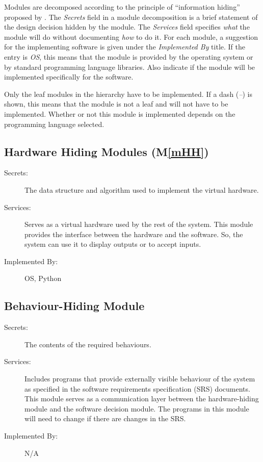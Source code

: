 \documentclass[12pt, titlepage]{article}
\newcommand{\mref}[1]{M\ref{#1}}
\begin{document}
Modules are decomposed according to the principle of ``information hiding''
proposed by . The \emph{Secrets} field in a module
decomposition is a brief statement of the design decision hidden by the
module. The \emph{Services} field specifies \emph{what} the module will do
without documenting \emph{how} to do it. For each module, a suggestion for the
implementing software is given under the \emph{Implemented By} title. If the
entry is \emph{OS}, this means that the module is provided by the operating
system or by standard programming language libraries.  Also indicate if the
module will be implemented specifically for the software.

Only the leaf modules in the
hierarchy have to be implemented. If a dash (\emph{--}) is shown, this means
that the module is not a leaf and will not have to be implemented. Whether or
not this module is implemented depends on the programming language
selected.

\subsection{Hardware Hiding Modules (\mref{mHH})}

\begin{description}
\item[Secrets:]The data structure and algorithm used to implement the virtual
  hardware.
\item[Services:]Serves as a virtual hardware used by the rest of the
  system. This module provides the interface between the hardware and the
  software. So, the system can use it to display outputs or to accept inputs.
\item[Implemented By:] OS, Python
\end{description}

\subsection{Behaviour-Hiding Module}

\begin{description}
\item[Secrets:]The contents of the required behaviours.
\item[Services:]Includes programs that provide externally visible behaviour of
  the system as specified in the software requirements specification (SRS)
  documents. This module serves as a communication layer between the
  hardware-hiding module and the software decision module. The programs in this
  module will need to change if there are changes in the SRS.
\item[Implemented By:] N/A
\end{description}
\end{document}
